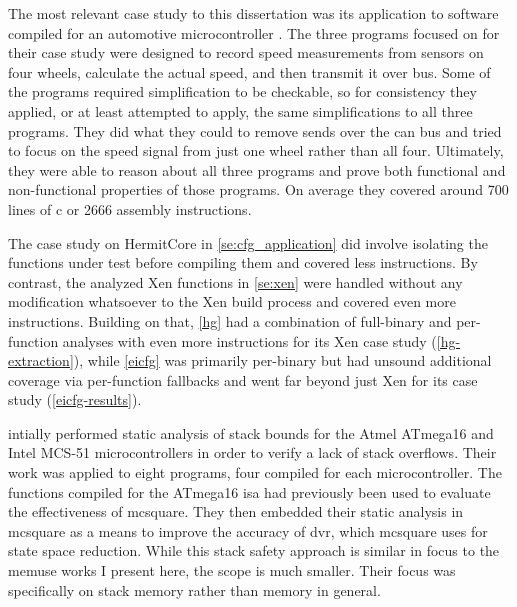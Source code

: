The most relevant case study to this dissertation was its application
to software compiled for an automotive microcontroller \autocite{schlich2007automotive}.
The three programs \citeauthor{schlich2007automotive} focused on for their case study were designed to record speed measurements from sensors on four wheels,
calculate the actual speed, and then transmit it over  bus.
Some of the programs required simplification to be checkable,
so for consistency they applied, or at least attempted to apply,
the same simplifications to all three programs.
They did what they could to remove sends over the \gls{can} bus
and tried to focus on the speed signal from just one wheel rather than all four.
Ultimately, they were able to reason about all three programs
and prove both functional and non-functional properties of those programs.
On average they covered around \num{700} lines of \gls{c} or \num{2666} assembly instructions.
\begin{remark}
  The case study on HermitCore in \cref{se:cfg_application} did involve isolating the functions under test before compiling them and covered less instructions.
  By contrast, the analyzed Xen functions in \cref{se:xen} were handled without any modification whatsoever to the Xen build process and covered even more instructions.
  Building on that, \cref{hg} had a combination of full-binary and per-function analyses with even more instructions for its Xen case study (\cref{hg-extraction}), while \cref{eicfg} was primarily per-binary but had unsound additional coverage via per-function fallbacks and went far beyond just Xen for its case study (\cref{eicfg-results}).
\end{remark}

\Textcite{brauer2009sba} intially performed static analysis of stack bounds
for the Atmel ATmega16 and Intel MCS-51 microcontrollers
in order to verify a lack of stack overflows.
Their work was applied to eight programs, four compiled for each microcontroller.
The functions compiled for the ATmega16 \gls{isa}
had previously been used to evaluate the effectiveness of \gls{mcsquare}.
They then embedded their static analysis in \gls{mcsquare} as a means to
improve the accuracy of \gls{dvr}, which \gls{mcsquare} uses for state space reduction.
While this stack safety approach is similar in focus to the \gls{memuse} works
I present here, the scope is much smaller.
Their focus was specifically on stack memory rather than memory in general.

